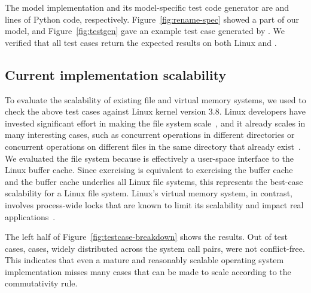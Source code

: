 The model implementation and its model-specific test code generator
are  and
 lines of Python code,
respectively.
Figure~\ref{fig:rename-spec} showed a part of our
model, and Figure~\ref{fig:testgen} gave an example test
case generated by \tool{}.  We verified that all test cases return
the expected results on both Linux and \sys.

\begin{figure*}
\small
\centering

\caption{
  Scalability for system call pairs, showing the fraction and number
  of test cases generated by \tool that are not
  conflict-free for each system call pair.
  One example test case was shown in Figure~\ref{fig:testgen}.
}
\label{fig:testcase-breakdown}
\end{figure*}


\subsection{Current implementation scalability}

To evaluate the scalability of existing file and virtual memory systems,
we used \mtrace{} to check the above test cases against
Linux kernel version 3.8.
Linux developers have invested significant effort in making the file
system scale~\cite{boyd-wickizer:scaling}, and it already scales in
many interesting cases, such as concurrent operations in different
directories or concurrent operations on different files in the same
directory that already exist~\cite{lwn:dcache}.
%
We evaluated the  file system because
 is effectively a user-space interface to the Linux buffer
cache.  Since exercising  is equivalent to exercising the
buffer cache and the buffer cache underlies all Linux file
systems, this represents the best-case scalability for a Linux file
system.
%
Linux's virtual memory system, in contrast, involves process-wide
locks that are known to limit its
scalability and impact real
applications~\cite{boyd-wickizer:scaling,clements:bonsai,gil:c4}.

The left half of Figure~\ref{fig:testcase-breakdown} shows the results.
Out of  test cases,
 cases, widely distributed across the
system call pairs, were not conflict-free.
This indicates that even a mature and reasonably scalable operating system
implementation misses many cases that can be made to scale according
to the commutativity rule.

